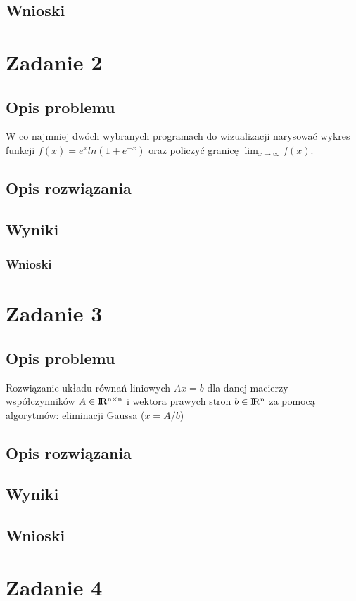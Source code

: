 \documentclass{classrep}
\begin{document}
	\subsection{Wnioski}
\section{Zadanie 2}
	\subsection{Opis problemu}
		W co najmniej dwóch wybranych programach do wizualizacji narysować wykres funkcji $f(x)=e^{x}ln(1+e^{-x})$ oraz policzyć granicę $\lim_{x \to \infty} f(x)$.
		
	\subsection{Opis rozwiązania}
	\subsection{Wyniki}			
	\subsubsection{Wnioski}
\section{Zadanie 3}
	\subsection{Opis problemu}
		Rozwiązanie układu równań liniowych $Ax = b$ dla danej macierzy współczynników $A 
		\in {\rm I\!R^{n \times n}}$ i wektora prawych stron $b \in {\rm I\!R^n}$ za 
		pomocą algorytmów: eliminacji Gaussa ($x=A/b$)%
	\subsection{Opis rozwiązania}
	\subsection{Wyniki}
		
	\subsection{Wnioski}
\section{Zadanie 4}
\end{document}
